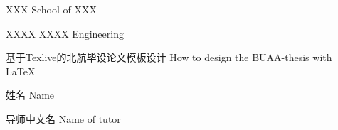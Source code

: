 
\school
{XXX}
{School of XXX}

\major
{XXXX}
{XXXX Engineering}

\thesistitle
{基于Texlive的北航毕设论文模板设计}
{How to design the BUAA-thesis with \LaTeX{}}

\thesisauthor
{姓名}
{Name}

\teacher
{导师中文名}
{Name of tutor}






